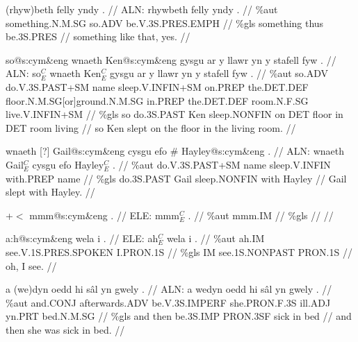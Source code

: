 \documentclass[a4paper,10pt]{article}
\begin{document}
\ex
\begingl[lingstyle=gergl]
\glchat (rhyw)beth felly yndy . //
\glsurface ALN:  rhywbeth felly yndy .  //
\glauto \%aut  something{\scriptsize .N.M.SG} so{\scriptsize .ADV} be{\scriptsize .V.3S.PRES.EMPH}   //
\glmanual \%gls  something thus be{\scriptsize .3S.PRES}   //
\gleng something like that, yes. //
\endgl
\xe

\ex
\begingl[lingstyle=gergl]
\glchat so@s:cym\&eng wnaeth Ken@s:cym\&eng gysgu ar y llawr yn y stafell fyw . //
\glsurface ALN:  so$^{C}_{E}$ wnaeth Ken$^{C}_{E}$ gysgu ar y llawr yn y stafell fyw .  //
\glauto \%aut  so{\scriptsize .ADV} do{\scriptsize .V.3S.PAST+SM} name sleep{\scriptsize .V.INFIN+SM} on{\scriptsize .PREP} the{\scriptsize .DET.DEF} floor{\scriptsize .N.M.SG[or]ground.N.M.SG} in{\scriptsize .PREP} the{\scriptsize .DET.DEF} room{\scriptsize .N.F.SG} live{\scriptsize .V.INFIN+SM}   //
\glmanual \%gls  so do{\scriptsize .3S.PAST} Ken sleep{\scriptsize .NONFIN} on DET floor in DET room living   //
\gleng so Ken slept on the floor in the living room. //
\endgl
\xe

\ex
\begingl[lingstyle=gergl]
\glchat wnaeth [?] Gail@s:cym\&eng cysgu efo \# Hayley@s:cym\&eng . //
\glsurface ALN:  wnaeth Gail$^{C}_{E}$ cysgu efo Hayley$^{C}_{E}$ .  //
\glauto \%aut  do{\scriptsize .V.3S.PAST+SM} name sleep{\scriptsize .V.INFIN} with{\scriptsize .PREP} name   //
\glmanual \%gls  do{\scriptsize .3S.PAST} Gail sleep{\scriptsize .NONFIN} with Hayley   //
\gleng Gail slept with Hayley. //
\endgl
\xe

\ex
\begingl[lingstyle=gergl]
\glchat +$<$ mmm@s:cym\&eng . //
\glsurface ELE:  mmm$^{C}_{E}$ .  //
\glauto \%aut  mmm{\scriptsize .IM}   //
\glmanual \%gls     //
\gleng  //
\endgl
\xe

\ex
\begingl[lingstyle=gergl]
\glchat a:h@s:cym\&eng wela i . //
\glsurface ELE:  ah$^{C}_{E}$ wela i .  //
\glauto \%aut  ah{\scriptsize .IM} see{\scriptsize .V.1S.PRES.SPOKEN} I{\scriptsize .PRON.1S}   //
\glmanual \%gls  IM see{\scriptsize .1S.NONPAST} PRON{\scriptsize .1S}   //
\gleng oh, I see. //
\endgl
\xe

\ex
\begingl[lingstyle=gergl]
\glchat a (we)dyn oedd hi sâl yn gwely . //
\glsurface ALN:  a wedyn oedd hi sâl yn gwely .  //
\glauto \%aut  and{\scriptsize .CONJ} afterwards{\scriptsize .ADV} be{\scriptsize .V.3S.IMPERF} she{\scriptsize .PRON.F.3S} ill{\scriptsize .ADJ} yn{\scriptsize .PRT} bed{\scriptsize .N.M.SG}   //
\glmanual \%gls  and then be{\scriptsize .3S.IMP} PRON{\scriptsize .3SF} sick in bed   //
\gleng and then she was sick in bed. //
\endgl
\xe
\end{document}
